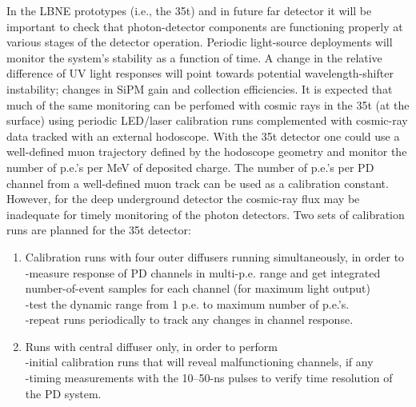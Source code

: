 In the LBNE prototypes (i.e., the 35t) and in future far detector it
will be important to check that photon-detector components are
functioning properly at various stages of the detector
operation. Periodic light-source deployments will monitor the system's
stability as a function of time. A change in the relative difference
of UV light responses will point towards potential wavelength-shifter
instability; changes in SiPM gain and collection efficiencies. It is
expected that much of the same monitoring can be perfomed with cosmic
rays in the 35t (at the surface) using periodic LED/laser calibration
runs complemented with cosmic-ray data tracked with an external
hodoscope. With the 35t detector one could use a well-defined muon
trajectory defined by the hodoscope geometry and monitor the number of
p.e.'s per MeV of deposited charge. The number of p.e.'s per PD
channel from a well-defined muon track can be used as a calibration
constant. However, for the deep underground detector the cosmic-ray
flux may be inadequate for timely monitoring of the photon detectors.
Two sets of calibration runs are planned for the 35t detector:
\begin{enumerate}
\item Calibration runs with four outer diffusers running simultaneously,
  in order to\\ -measure response of PD channels in multi-p.e. range and
  get integrated number-of-event samples for each channel (for maximum
  light output)\\ -test the dynamic range from 1 p.e. to maximum
  number of p.e.'s. \\ -repeat runs periodically to track any changes in
  channel response.
       
\item Runs with central diffuser only, in order to perform \\ -initial
  calibration runs that will reveal malfunctioning channels, if
  any\\ -timing measurements with the 10--50-ns pulses to verify time
  resolution of the PD system.
\end{enumerate}

